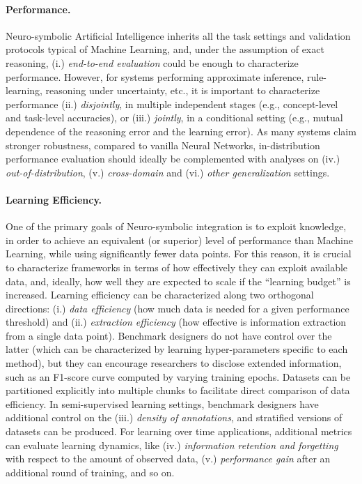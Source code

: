 \paragraph{Performance.} %
Neuro-symbolic Artificial Intelligence inherits all the task settings and validation protocols typical of Machine Learning, and, under the assumption of exact reasoning, (i.) \textit{end-to-end evaluation} could be enough to characterize performance. However, for systems performing approximate inference, rule-learning, reasoning under uncertainty, etc., it is important to characterize performance (ii.) \textit{disjointly}, in multiple independent stages (e.g., concept-level and task-level accuracies), or (iii.) \textit{jointly}, in a conditional setting (e.g., mutual dependence of the reasoning error and the learning error). 
As many systems claim stronger robustness, compared to vanilla Neural Networks, in-distribution performance evaluation should ideally be complemented with analyses on (iv.) \textit{out-of-distribution}, (v.) \textit{cross-domain} and (vi.) \textit{other generalization} settings.

\paragraph{Learning Efficiency.} One of the primary goals of Neuro-symbolic integration is to exploit knowledge, in order to achieve an equivalent (or superior) level of performance than Machine Learning, while using significantly fewer data points. For this reason, it is crucial to characterize frameworks in terms of how effectively they can exploit available data, and, ideally, how well they are expected to scale if the ``learning budget'' is increased. 
%
Learning efficiency can be characterized along two orthogonal directions: (i.) \textit{data efficiency} (how much data is needed for a given performance threshold) and (ii.) \textit{extraction efficiency} (how effective is information extraction from a single data point).
Benchmark designers do not have control over the latter (which can be characterized by learning hyper-parameters specific to each method), but they can encourage researchers to disclose extended information, such as an F1-score curve computed by varying training epochs.
Datasets can be partitioned explicitly into multiple chunks to facilitate direct comparison of data efficiency. 
%
In semi-supervised learning settings, benchmark designers have additional control on the (iii.) \textit{density of annotations}, and stratified versions of datasets can be produced.
For learning over time applications, additional metrics can evaluate learning dynamics, like (iv.) \textit{information retention and forgetting} with respect to the amount of observed data, (v.) \textit{performance gain} after an additional round of training, and so on.


